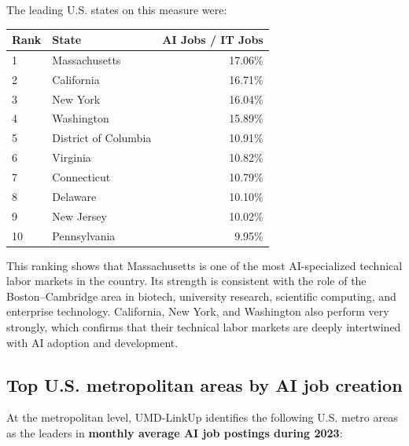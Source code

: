 \documentclass[12pt,a4paper]{article}
\begin{document}
The leading U.S. states on this measure were:

\begin{center}
\begin{tabular}{llr}
\toprule
\textbf{Rank} & \textbf{State} & \textbf{AI Jobs / IT Jobs} \\
\midrule
1 & Massachusetts & 17.06\% \\
2 & California & 16.71\% \\
3 & New York & 16.04\% \\
4 & Washington & 15.89\% \\
5 & District of Columbia & 10.91\% \\
6 & Virginia & 10.82\% \\
7 & Connecticut & 10.79\% \\
8 & Delaware & 10.10\% \\
9 & New Jersey & 10.02\% \\
10 & Pennsylvania & 9.95\% \\
\bottomrule
\end{tabular}
\end{center}

This ranking shows that Massachusetts is one of the most AI-specialized technical labor markets in the country. Its strength is consistent with the role of the Boston--Cambridge area in biotech, university research, scientific computing, and enterprise technology. California, New York, and Washington also perform very strongly, which confirms that their technical labor markets are deeply intertwined with AI adoption and development.

\subsection{Top U.S. metropolitan areas by AI job creation}

At the metropolitan level, UMD-LinkUp identifies the following U.S. metro areas as the leaders in \textbf{monthly average AI job postings during 2023}:
\end{document}

